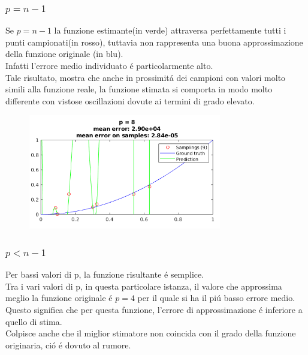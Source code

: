 \documentclass[12pt]{article}
\begin{document}
\subsubsection{$p=n-1$}
Se $p=n-1$ la funzione estimante(in verde) attraversa perfettamente tutti i punti campionati(in rosso),
tuttavia non rappresenta una buona approssimazione della funzione originale (in blu). \\
Infatti l'errore medio individuato é particolarmente alto. \\
Tale risultato, mostra che anche in prossimitá dei campioni con valori molto simili alla funzione reale,
la funzione stimata si comporta in modo molto differente con vistose oscillazioni dovute ai termini di grado elevato.

\begin{figure}[H]
  \centering
  \includegraphics[width=0.75\textwidth]{plots/regression/maximum_p.png}
\end{figure}

\subsubsection{$p<n-1$}

Per bassi valori di p, la funzione risultante é semplice. \\
Tra i vari valori di p, in questa particolare istanza,
il valore che approssima meglio la funzione originale é $p=4$
per il quale si ha il piú basso errore medio. \\
Questo significa che per questa funzione,
l'errore di approssimazione é inferiore a quello di stima. \\
Colpisce anche che il miglior stimatore non coincida con il grado della funzione originaria,
ció é dovuto al rumore. \\
\end{document}
